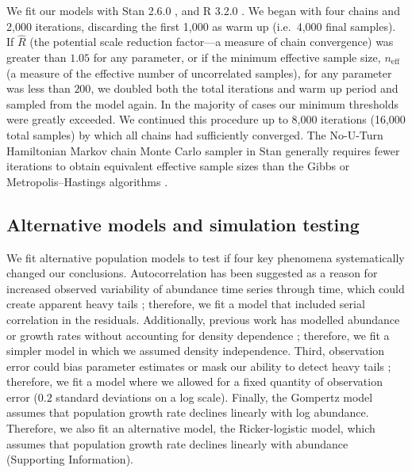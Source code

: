 \documentclass[9pt,twocolumn,twoside]{pnas-new}
\begin{document}
{We fit our models with Stan 2.6.0 \cite{stan-manual2015, hoffman2014}, and R
3.2.0 \cite{r2015}. We began with four chains and 2,000 iterations, discarding
the first 1,000 as warm up (i.e.~4,000 final samples). If \(\hat{R}\) (the
potential scale reduction factor---a measure of chain convergence) was greater
than \(1.05\) for any parameter, or if the minimum effective sample size,
\(n_\mathrm{eff}\) (a measure of the effective number of uncorrelated samples),
for any parameter was less than \(200\), we doubled both the total iterations
and warm up period and sampled from the model again. 
In the majority of cases our minimum thresholds were
greatly exceeded. We continued this procedure up to 8,000 iterations (16,000
total samples) by which all chains had sufficiently converged.
The No-U-Turn Hamiltonian Markov chain Monte Carlo sampler in Stan generally
requires fewer iterations to obtain equivalent effective sample sizes than the
Gibbs or Metropolis--Hastings algorithms \cite{stan-manual2015}.

\subsection{Alternative models and simulation testing}
We fit alternative population models to test if four key phenomena
systematically changed our conclusions. Autocorrelation has been suggested as
a reason for increased observed variability of abundance time series through
time, which could create apparent heavy tails \citep{inchausti2002};
therefore, we fit a model that included serial correlation in the residuals.
Additionally, previous work has modelled abundance or growth rates without
accounting for density dependence \citep{halley2002,segura2013}; therefore, we
fit a simpler model in which we assumed density independence. Third,
observation error could bias parameter estimates \citep{knape2012} or mask our
ability to detect heavy tails \citep{ward2007}; therefore, we fit a model
where we allowed for a fixed quantity of observation error ($0.2$ standard
deviations on a log scale). Finally, the Gompertz model assumes that
population growth rate declines linearly with log abundance. Therefore, we
also fit an alternative model, the Ricker-logistic model, which assumes that
population growth rate declines linearly with abundance (Supporting Information).

}
\end{document}
